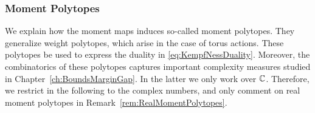 





\subsubsection{Moment Polytopes}

We explain how the moment maps induces so-called moment polytopes. They generalize weight polytopes, which arise in the case of torus actions. These polytopes be used to express the duality in \eqref{eq:KempfNessDuality}. Moreover, the combinatorics of these polytopes captures important complexity measures studied in Chapter~\ref{ch:BoundsMarginGap}.
In the latter we only work over $\mathbb C$. Therefore, we restrict in the following to the complex numbers, and only comment on real moment polytopes in Remark~\ref{rem:RealMomentPolytopes}.

\bigskip

